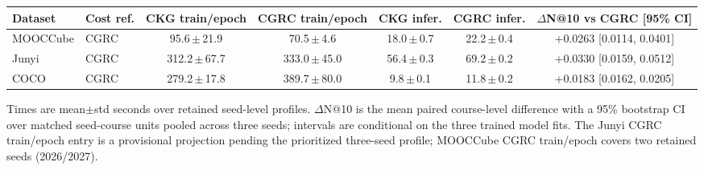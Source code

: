\documentclass[varwidth=20cm,border=8pt]{standalone}
\begin{document}
\begin{minipage}{18cm}
\centering
{
\small
\setlength{\tabcolsep}{2.4pt}
\renewcommand{\arraystretch}{1.02}
\begin{tabular*}{\linewidth}{@{\extracolsep{\fill}}llccccc}
\toprule
Dataset & Cost ref. & CKG train/epoch & CGRC train/epoch & CKG infer. & CGRC infer. & \(\Delta\)N@10 vs CGRC [95\% CI] \\
\midrule
MOOCCube & CGRC & 95.6\,$\pm$\,21.9 & 70.5\,$\pm$\,4.6 & 18.0\,$\pm$\,0.7 & 22.2\,$\pm$\,0.4 & +0.0263 [0.0114, 0.0401] \\
Junyi & CGRC & 312.2\,$\pm$\,67.7 & 333.0\,$\pm$\,45.0 & 56.4\,$\pm$\,0.3 & 69.2\,$\pm$\,0.2 & +0.0330 [0.0159, 0.0512] \\
COCO & CGRC & 279.2\,$\pm$\,17.8 & 389.7\,$\pm$\,80.0 & 9.8\,$\pm$\,0.1 & 11.8\,$\pm$\,0.2 & +0.0183 [0.0162, 0.0205] \\
\bottomrule
\end{tabular*}
}
\setcounter{table}{3}
\label{tab:efficiency-aaai-preview}
\vspace{2pt}
\parbox{\linewidth}{\footnotesize Times are mean\(\pm\)std seconds over retained seed-level profiles. \(\Delta\)N@10 is the mean paired course-level difference with a 95\% bootstrap CI over matched seed-course units pooled across three seeds; intervals are conditional on the three trained model fits. The Junyi CGRC train/epoch entry is a provisional projection pending the prioritized three-seed profile; MOOCCube CGRC train/epoch covers two retained seeds (2026/2027).}
\end{minipage}
\end{document}
